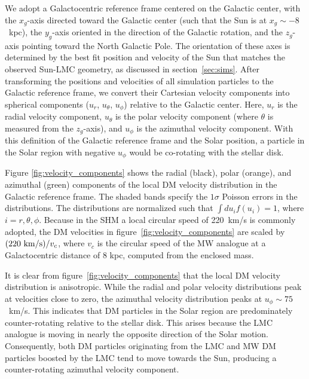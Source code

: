 \documentclass[a4paper,11pt]{article}
\begin{document}
We adopt a Galactocentric reference frame centered on the Galactic center, with the $x_{g}$-axis directed toward the Galactic center (such that the Sun is at $x_g\sim -8$~kpc), the $y_{g}$-axis oriented in the direction of the Galactic rotation, and the $z_{g}$-axis pointing toward the North Galactic Pole. The orientation of these axes is determined by the best fit position and velocity of the Sun that matches the observed Sun-LMC geometry, as discussed in section~\ref{sec:sims}. After transforming the positions and velocities of all simulation particles to the Galactic reference frame, we convert their Cartesian velocity components into  spherical components ($u_{r}$, $u_{\theta}$, $u_{\phi}$) relative to the Galactic center. Here, $u_{r}$ is the radial velocity component, $u_{\theta}$ is the polar velocity component (where $\theta$ is measured from the $z_g$-axis), and $u_{\phi}$ is the azimuthal velocity component. With this definition of the Galactic reference frame and the Solar position, a particle in the Solar region with negative $u_\phi$ would be co-rotating with the stellar disk.

Figure \ref{fig:velocity_components} shows the radial (black), polar (orange), and azimuthal (green) components of the local DM velocity distribution in the Galactic reference frame. The shaded bands specify the $1\sigma$ Poisson errors in the distributions. The distributions are normalized such that $\int du_i f(u_i)=1$, where $i=r, \theta, \phi$. Because in the SHM a local circular speed of 220~km/s is commonly adopted, the DM velocities in figure~\ref{fig:velocity_components} are scaled by $(220~{\rm km/s})/v_c$, where $v_c$ is the circular speed of the MW analogue at a Galactocentric distance of 8 kpc, computed from the enclosed mass. 

It is clear from figure~\ref{fig:velocity_components} that the local DM velocity distribution is anisotropic. While the radial and polar velocity distributions peak at velocities close to zero, the azimuthal velocity distribution peaks at $u_\phi \sim 75$~km/s. This indicates that DM particles in the Solar region are predominately counter-rotating relative to the stellar disk. This arises because the LMC analogue is moving in nearly the opposite direction of the Solar motion. Consequently, both DM particles originating from the LMC and MW DM particles boosted by the LMC tend to move towards the Sun, producing a counter-rotating azimuthal velocity component. 
\end{document}

